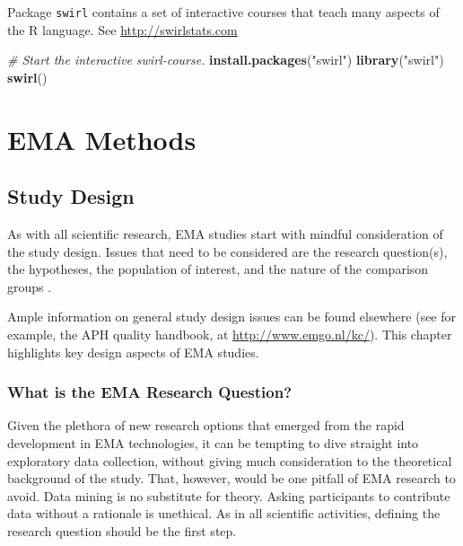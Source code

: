 \documentclass[]{book}
\newenvironment{Shaded}{\begin{snugshade}}{\end{snugshade}}
\newcommand{\KeywordTok}[1]{\textcolor[rgb]{0.13,0.29,0.53}{\textbf{#1}}}
\newcommand{\StringTok}[1]{\textcolor[rgb]{0.31,0.60,0.02}{#1}}
\newcommand{\CommentTok}[1]{\textcolor[rgb]{0.56,0.35,0.01}{\textit{#1}}}
\newcommand{\NormalTok}[1]{#1}
\begin{document}

Package \texttt{swirl} contains a set of interactive courses that teach
many aspects of the R language. See \url{http://swirlstats.com}

\begin{Shaded}
\begin{Highlighting}[]
\CommentTok{# Start the interactive swirl-course.}
\KeywordTok{install.packages}\NormalTok{(}\StringTok{"swirl"}\NormalTok{)}
\KeywordTok{library}\NormalTok{(}\StringTok{"swirl"}\NormalTok{)}
\KeywordTok{swirl}\NormalTok{()}
\end{Highlighting}
\end{Shaded}

\part{EMA Methods}\label{part-ema-methods}

\chapter{Study Design}\label{methods}

 

As with all scientific research, EMA studies start with mindful
consideration of the study design. Issues that need to be considered are
the research question(s), the hypotheses, the population of interest,
and the nature of the comparison groups \citep{Shiffman2008}.

Ample information on general study design issues can be found elsewhere
(see for example, the APH quality handbook, at
\url{http://www.emgo.nl/kc/}). This chapter highlights key design
aspects of EMA studies.

\section{What is the EMA Research
Question?}\label{what-is-the-ema-research-question}

Given the plethora of new research options that emerged from the rapid
development in EMA technologies, it can be tempting to dive straight
into exploratory data collection, without giving much consideration to
the theoretical background of the study. That, however, would be one
pitfall of EMA research to avoid. Data mining is no substitute for
theory. Asking participants to contribute data without a rationale is
unethical. As in all scientific activities, defining the research
question should be the first step.
\end{document}
